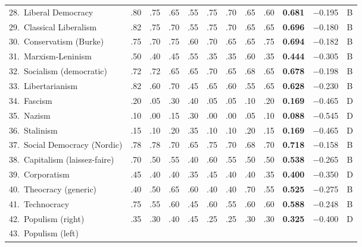 \documentclass[11pt,a4paper]{article}
\theoremstyle{definition}
\theoremstyle{remark}
\begin{document}
\begin{longtable}{@{}l|cccccccc|cc|c@{}}
28.\ Liberal Democracy
  & .80 & .75 & .65 & .55 & .75 & .70 & .65 & .60
  & \textbf{0.681} & $-$0.195 & \textcolor{borderline}{B} \\
29.\ Classical Liberalism
  & .82 & .75 & .70 & .55 & .75 & .70 & .65 & .65
  & \textbf{0.696} & $-$0.180 & \textcolor{borderline}{B} \\
30.\ Conservatism (Burke)
  & .75 & .70 & .75 & .60 & .70 & .65 & .65 & .75
  & \textbf{0.694} & $-$0.182 & \textcolor{borderline}{B} \\
31.\ Marxism-Leninism
  & .50 & .40 & .45 & .55 & .35 & .35 & .60 & .35
  & \textbf{0.444} & $-$0.305 & \textcolor{borderline}{B} \\
32.\ Socialism (democratic)
  & .72 & .72 & .65 & .65 & .70 & .65 & .68 & .65
  & \textbf{0.678} & $-$0.198 & \textcolor{borderline}{B} \\
33.\ Libertarianism
  & .82 & .60 & .70 & .45 & .65 & .60 & .55 & .65
  & \textbf{0.628} & $-$0.230 & \textcolor{borderline}{B} \\
34.\ Fascism
  & .20 & .05 & .30 & .40 & .05 & .05 & .10 & .20
  & \textbf{0.169} & $-$0.465 & \textcolor{collapse}{D} \\
35.\ Nazism
  & .10 & .00 & .15 & .30 & .00 & .00 & .05 & .10
  & \textbf{0.088} & $-$0.545 & \textcolor{collapse}{D} \\
36.\ Stalinism
  & .15 & .10 & .20 & .35 & .10 & .10 & .20 & .15
  & \textbf{0.169} & $-$0.465 & \textcolor{collapse}{D} \\
37.\ Social Democracy (Nordic)
  & .78 & .78 & .70 & .65 & .75 & .70 & .68 & .70
  & \textbf{0.718} & $-$0.158 & \textcolor{borderline}{B} \\
38.\ Capitalism (laissez-faire)
  & .70 & .50 & .55 & .40 & .60 & .55 & .50 & .50
  & \textbf{0.538} & $-$0.265 & \textcolor{borderline}{B} \\
39.\ Corporatism
  & .45 & .40 & .40 & .35 & .45 & .40 & .40 & .35
  & \textbf{0.400} & $-$0.350 & \textcolor{collapse}{D} \\
40.\ Theocracy (generic)
  & .40 & .50 & .65 & .60 & .40 & .40 & .70 & .55
  & \textbf{0.525} & $-$0.275 & \textcolor{borderline}{B} \\
41.\ Technocracy
  & .75 & .55 & .60 & .45 & .60 & .55 & .60 & .60
  & \textbf{0.588} & $-$0.248 & \textcolor{borderline}{B} \\
42.\ Populism (right)
  & .35 & .30 & .40 & .45 & .25 & .25 & .30 & .30
  & \textbf{0.325} & $-$0.400 & \textcolor{collapse}{D} \\
43.\ Populism (left)

\end{longtable}
\end{document}
